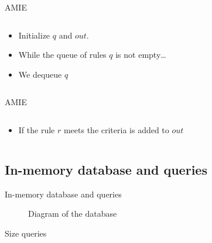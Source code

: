 \documentclass[xcolor={x11names}]{beamer}
\begin{document}
\begin{frame}{AMIE}
\begin{columns}

\begin{column}{0.4\textwidth}
	\begin{itemize}
        \item Initialize $q$ and $out$.
        \item While the queue of rules $q$ is not empty\ldots
        \item We dequeue $q$
	\end{itemize}
\end{column}

\begin{column}{0.6\textwidth}
    \resizebox{!}{0.8\textwidth}{%
        
    }
\end{column}
\end{columns}
\end{frame}


\begin{frame}{AMIE}
\begin{columns}

\begin{column}{0.4\textwidth}
	\begin{itemize}
        \item If the rule $r$ meets the criteria is added to $out$
	\end{itemize}
\end{column}

\begin{column}{0.6\textwidth}
    \resizebox{!}{0.8\textwidth}{%
        
    }
\end{column}
\end{columns}
\end{frame}

\subsection{In-memory database and queries}

\begin{frame}{In-memory database and queries}
\begin{figure}
    
\caption{Diagram of the database}
\label{fig:db}
\end{figure}
\end{frame}

\begin{frame}{Size queries}
\end{frame}
\end{document}
